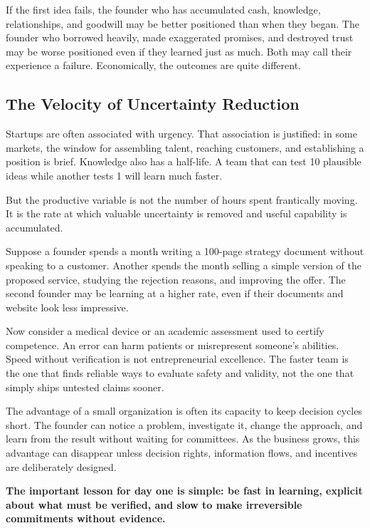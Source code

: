 If the first idea fails, the founder who has accumulated cash, knowledge, relationships, and goodwill may be better positioned than when they began. The founder who borrowed heavily, made exaggerated promises, and destroyed trust may be worse positioned even if they learned just as much. Both may call their experience a failure. Economically, the outcomes are quite different.

\subsection{The Velocity of Uncertainty Reduction}

Startups are often associated with urgency. That association is justified: in some markets, the window for assembling talent, reaching customers, and establishing a position is brief. Knowledge also has a half-life. A team that can test 10 plausible ideas while another tests 1 will learn much faster.

But the productive variable is not the number of hours spent frantically moving. It is the rate at which valuable uncertainty is removed and useful capability is accumulated.

Suppose a founder spends a month writing a 100-page strategy document without speaking to a customer. Another spends the month selling a simple version of the proposed service, studying the rejection reasons, and improving the offer. The second founder may be learning at a higher rate, even if their documents and website look less impressive.

Now consider a medical device or an academic assessment used to certify competence. An error can harm patients or misrepresent someone's abilities. Speed without verification is not entrepreneurial excellence. The faster team is the one that finds reliable ways to evaluate safety and validity, not the one that simply ships untested claims sooner.

The advantage of a small organization is often its capacity to keep decision cycles short. The founder can notice a problem, investigate it, change the approach, and learn from the result without waiting for committees. As the business grows, this advantage can disappear unless decision rights, information flows, and incentives are deliberately designed.

\textbf{The important lesson for day one is simple: be fast in learning, explicit about what must be verified, and slow to make irreversible commitments without evidence.}

